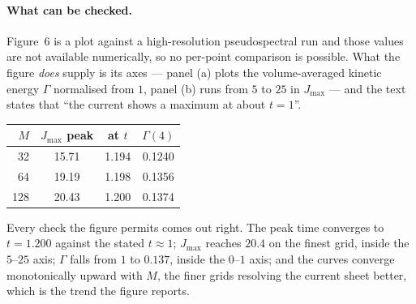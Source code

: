 \documentclass[11pt,a4paper]{article}
\begin{document}
\paragraph{What can be checked.} Figure~6 is a plot against a high-resolution
pseudospectral run and those values are not available numerically, so no
per-point comparison is possible. What the figure \emph{does} supply is its axes
--- panel (a) plots the volume-averaged kinetic energy $\Gamma$ normalised from
$1$, panel (b) runs from $5$ to $25$ in $J_{\max}$ --- and the text states that
``the current shows a maximum at about $t=1$''.

\begin{center}\small
\begin{tabular}{rccc}
\toprule
$M$ & $J_{\max}$ peak & at $t$ & $\Gamma(4)$ \\
\midrule
32  & 15.71 & 1.194 & 0.1240 \\
64  & 19.19 & 1.198 & 0.1356 \\
128 & 20.43 & 1.200 & 0.1374 \\
\bottomrule
\end{tabular}
\end{center}

\noindent Every check the figure permits comes out right. The peak time
converges to $t=1.200$ against the stated $t\approx1$; $J_{\max}$ reaches $20.4$
on the finest grid, inside the $5$--$25$ axis; $\Gamma$ falls from $1$ to
$0.137$, inside the $0$--$1$ axis; and the curves converge monotonically upward
with $M$, the finer grids resolving the current sheet better, which is the trend
the figure reports.
\end{document}
